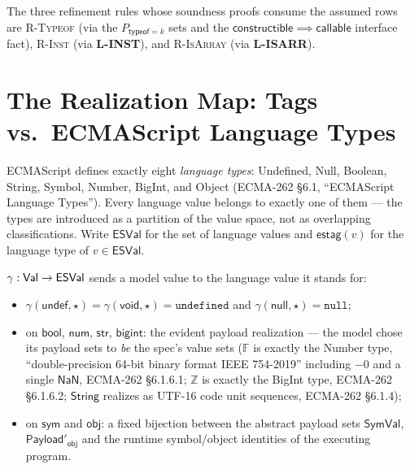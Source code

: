 \documentclass[11pt]{article}
\newcommand{\String}{\mathsf{String}}
\newcommand{\SymVal}{\mathsf{SymVal}}
\newcommand{\Payload}{\mathsf{Payload}}
\newcommand{\ESVal}{\mathsf{ESVal}}
\newcommand{\estag}{\mathsf{estag}}
\newcommand{\realize}{\gamma}
\newcommand{\ecma}[1]{ECMA-262 \S#1}
\begin{document}
The three refinement rules whose soundness proofs consume the assumed
rows are \textsc{R-Typeof} (via the $P_{\mathsf{typeof}=k}$ sets and the
$\mathsf{constructible} \implies \mathsf{callable}$ interface fact),
\textsc{R-Inst} (via \textbf{L-INST}), and \textsc{R-IsArray} (via
\textbf{L-ISARR}).

\section{The Realization Map: Tags vs.\ ECMAScript Language Types}
\label{sec:tags}

ECMAScript defines exactly eight \emph{language types}: Undefined,
Null, Boolean, String, Symbol, Number, BigInt, and Object
(\ecma{6.1}, ``ECMAScript Language Types''). Every language value belongs
to exactly one of them — the types are introduced as a partition of the
value space, not as overlapping classifications. Write $\ESVal$ for the
set of language values and $\estag(v)$ for the language type of
$v \in \ESVal$.

\begin{definition}
\label{def:gamma}
$\realize : \Val \to \ESVal$ sends a model value to the language value it
stands for:
\begin{itemize}
\item $\realize(\mathsf{undef}, \star) = \realize(\mathsf{void}, \star)
  = \texttt{undefined}$ and $\realize(\mathsf{null}, \star) =
  \texttt{null}$;
\item on $\mathsf{bool}$, $\mathsf{num}$, $\mathsf{str}$,
  $\mathsf{bigint}$: the evident payload realization — the model chose
  its payload sets to \emph{be} the spec's value sets
  ($\mathbb{F}$ is exactly the Number type, ``double-precision 64-bit
  binary format IEEE 754-2019'' including $-0$ and a single
  $\mathsf{NaN}$, \ecma{6.1.6.1}; $\mathbb{Z}$ is exactly the BigInt
  type, \ecma{6.1.6.2}; $\String$ realizes as UTF-16 code unit
  sequences, \ecma{6.1.4});
\item on $\mathsf{sym}$ and $\mathsf{obj}$: a fixed bijection between the
  abstract payload sets $\SymVal$, $\Payload'_{\mathsf{obj}}$ and the
  runtime symbol/object identities of the executing program.
\end{itemize}
\end{definition}
\end{document}
